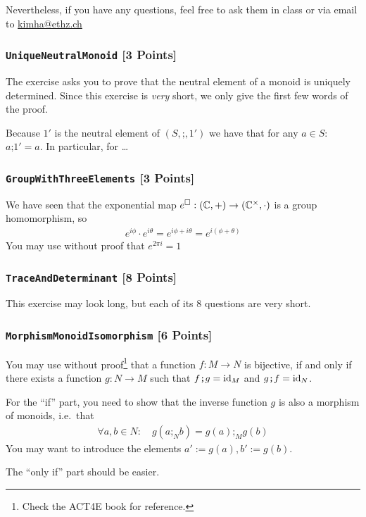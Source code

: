 Nevertheless, if you have any questions, feel free to ask them in class or via email to \href{mailto:kimha@ethz.ch}{kimha@ethz.ch}

\subsubsection{\texttt{UniqueNeutralMonoid} [3 Points]}
The exercise asks you to prove that the neutral element of a monoid is uniquely determined.
Since this exercise is \emph{very} short, we only give the first few words of the proof.


Because $1'$ is the neutral element of $(S,\texttt{;},1')$ we have that for any $a \in S$:
$a \texttt{;}1' = a$.
In particular, for \ldots

\subsubsection{\texttt{GroupWithThreeElements} [3 Points]}
We have seen that the exponential map $e^{\square}: (\mathbb{C},+) \to (\mathbb{C}^{\times},\cdot)$ is a group homomorphism, so
\begin{align*}
  e^{i \phi} \cdot e^{i \theta} = e^{i \phi + i \theta} = e^{i(\phi + \theta)}
\end{align*}
You may use without proof that $e^{2 \pi i} = 1$

\subsubsection{\texttt{TraceAndDeterminant} [8 Points]}
This exercise may look long, but each of its 8 questions are very short.


\subsubsection{\texttt{MorphismMonoidIsomorphism} [6 Points]}
You may use without proof\footnote{Check the ACT4E book for reference.} that a function $f: M \to N$ is bijective, if and only if there exists a function $g: N \to M$ such that $f \texttt{;}g = \operatorname{id}_M$ and $g \texttt{;}f = \operatorname{id}_N$.

For the ``if'' part, you need to show that the inverse function $g$ is also a morphism of monoids, i.e.\ that 
\begin{align*}
  \forall a,b \in N \colon \quad
  g(a \texttt{;}_N b) = g(a) \texttt{;}_M g(b)
\end{align*}
You may want to introduce the elements $a' := g(a), b':= g(b)$.

The ``only if'' part should be easier.
